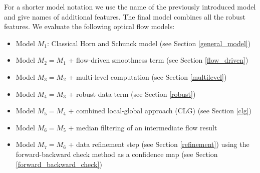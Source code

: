 For a shorter model notation we use the name of the previously introduced model and give names of additional features. The final model combines all the robust features. We evaluate the following optical flow models:
\begin{itemize}
	\item Model $M_1$: Classical Horn and Schunck model (see Section \ref{general_model})
	\item Model $M_2 = M_1$ + flow-driven smoothness term (see Section \ref{flow_driven})
    \item Model $M_3 = M_2$ + multi-level computation (see Section \ref{multilevel})
	\item Model $M_4 = M_3$ + robust data term (see Section \ref{robust})   
    \item Model $M_5 = M_4$ + combined local-global approach (CLG) (see Section \ref{clg})
    \item Model $M_6 = M_5$ + median filtering of an intermediate flow result
    \item Model $M_7 = M_6$ + data refinement step (see Section \ref{refinement}) using the forward-backward check method as a confidence map (see Section \ref{forward_backward_check})
\end{itemize}






